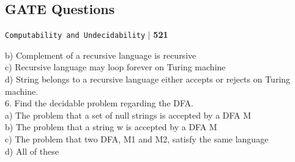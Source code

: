 \documentclass[8pt]{beamer}
\begin{document}
\begin{frame}
 \section*{GATE Questions}
\begin{flushright}
 \texttt{Computability and Undecidability} \hspace*{0.1cm}\textbf{$|$} \hspace*{0.1cm} \textbf{521}\hspace*{0.1cm}
\end{flushright}
\vspace*{0.5cm}

\begin{multicols}{2}

\hspace*{0.5cm}
b) Complement of a recursive language is
recursive\\

\vspace*{0.1cm}
\hspace*{0.5cm}
c) Recursive language may loop forever
on Turing machine\\

\vspace*{0.1cm}
\hspace*{0.5cm}
d) String belongs to a recursive language
either accepts or rejects on Turing
machine.\\

\vspace*{0.2cm}
6. Find the decidable problem regarding the
DFA.\\

\vspace*{0.1cm}
\hspace*{0.5cm} a) The problem that a set of null strings is
accepted by a DFA M\\

\vspace*{0.1cm}
\hspace*{0.5cm} b) The problem that a string w is accepted
by a DFA M\\

\vspace*{0.1cm}
\hspace*{0.5cm} c) The problem that two DFA, M1 and M2,
satisfy the same language\\

\vspace*{0.1cm}
\hspace*{0.5cm} d) All of these\\



\end{multicols}
\end{frame}
\end{document}
